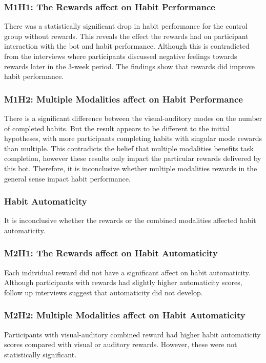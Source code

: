 \subsubsection*{M1H1: The Rewards affect on Habit Performance}
There was a statistically significant drop in habit performance for the control group without rewards. This reveals the effect the rewards had on participant interaction with the bot and habit performance. Although this is contradicted from the interviews where participants discussed negative feelings towards rewards later in the 3-week period. The findings show that rewards did improve habit performance.

\subsubsection*{M1H2: Multiple Modalities affect on Habit Performance}
There is a significant difference between the visual-auditory modes on the number of completed habits. But the result appears to be different to the initial hypotheses, with more participants completing habits with singular mode rewards than multiple. This contradicts the belief that multiple modalities benefits task completion, however these results only impact the particular rewards delivered by this bot. Therefore, it is inconclusive whether multiple modalities rewards in the general sense impact habit performance.


\subsubsection{Habit Automaticity}
It is inconclusive whether the rewards or the combined modalities affected habit automaticity.

\subsubsection*{M2H1: The Rewards affect on Habit Automaticity}
Each individual reward did not have a significant affect on habit automaticity. Although participants with rewards had slightly higher automaticity scores, follow up interviews suggest that automaticity did not develop.

\subsubsection*{M2H2: Multiple Modalities affect on Habit Automaticity}
Participants with visual-auditory combined reward had higher habit automaticity scores compared with visual or auditory rewards. However, these were not statistically significant.


